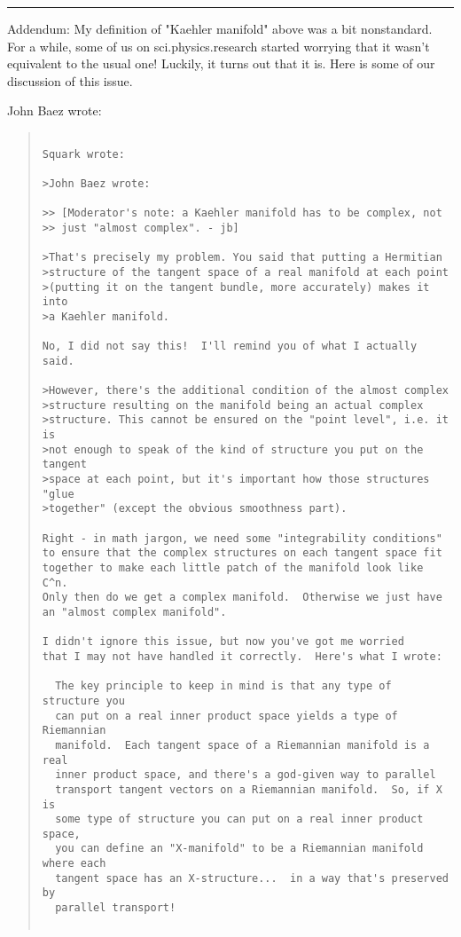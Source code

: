 \par\noindent\rule{\textwidth}{0.4pt}
Addendum: My definition of "Kaehler manifold" above was a bit
nonstandard.  For a while, some of us on sci.physics.research
started worrying that it wasn't equivalent to the usual one!  Luckily,
it turns out that it is.  Here is some of our discussion of this issue.

John Baez wrote:

\begin{quote}

\begin{verbatim}

Squark wrote:

>John Baez wrote:

>> [Moderator's note: a Kaehler manifold has to be complex, not
>> just "almost complex". - jb]  

>That's precisely my problem. You said that putting a Hermitian
>structure of the tangent space of a real manifold at each point
>(putting it on the tangent bundle, more accurately) makes it into
>a Kaehler manifold.

No, I did not say this!  I'll remind you of what I actually said.

>However, there's the additional condition of the almost complex
>structure resulting on the manifold being an actual complex
>structure. This cannot be ensured on the "point level", i.e. it is
>not enough to speak of the kind of structure you put on the tangent
>space at each point, but it's important how those structures "glue
>together" (except the obvious smoothness part).

Right - in math jargon, we need some "integrability conditions"
to ensure that the complex structures on each tangent space fit
together to make each little patch of the manifold look like C^n.
Only then do we get a complex manifold.  Otherwise we just have
an "almost complex manifold".  

I didn't ignore this issue, but now you've got me worried
that I may not have handled it correctly.  Here's what I wrote:

  The key principle to keep in mind is that any type of structure you
  can put on a real inner product space yields a type of Riemannian 
  manifold.  Each tangent space of a Riemannian manifold is a real
  inner product space, and there's a god-given way to parallel
  transport tangent vectors on a Riemannian manifold.  So, if X is
  some type of structure you can put on a real inner product space,
  you can define an "X-manifold" to be a Riemannian manifold where each
  tangent space has an X-structure...  in a way that's preserved by
  parallel transport!


\end{verbatim}
\end{quote}

